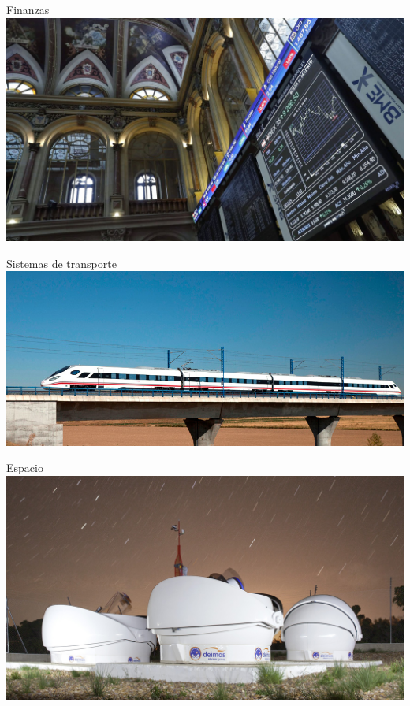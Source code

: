 \begin{frame}{Finanzas}
\centering
\includegraphics[height=.85\textheight]{img/bolsa.jpg}
\end{frame}

\begin{frame}{Sistemas de transporte}
\centering
\includegraphics[height=.85\textheight]{img/caf-ferrocarril.jpg}
\end{frame}

\begin{frame}{Espacio}
\centering
\includegraphics[height=.85\textheight]{img/antenas-deimos.jpg}
\end{frame}

